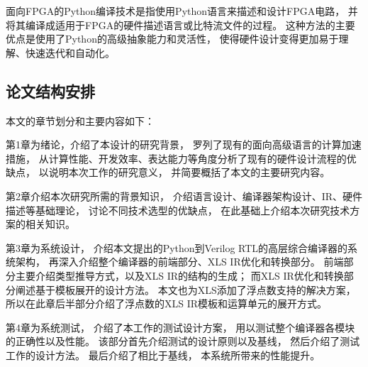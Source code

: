面向FPGA的Python编译技术是指使用Python语言来描述和设计FPGA电路，
并将其编译成适用于FPGA的硬件描述语言或比特流文件的过程。
这种方法的主要优点是使用了Python的高级抽象能力和灵活性，
使得硬件设计变得更加易于理解、快速迭代和自动化。

\subsection{论文结构安排}

本文的章节划分和主要内容如下：

第1章为绪论，介绍了本设计的研究背景，
罗列了现有的面向高级语言的计算加速措施，
从计算性能、开发效率、表达能力等角度分析了现有的硬件设计流程的优缺点，
以说明本次工作的研究意义，
并简要概括了本文的主要研究内容。

第2章介绍本次研究所需的背景知识，
介绍语言设计、编译器架构设计、IR、硬件描述等基础理论，
讨论不同技术选型的优缺点，
在此基础上介绍本次研究技术方案的相关知识。

第3章为系统设计，
介绍本文提出的Python到Verilog RTL的高层综合编译器的系统架构，
再深入介绍整个编译器的前端部分、XLS IR优化和转换部分。
前端部分主要介绍类型推导方式，以及XLS IR的结构的生成；
而XLS IR优化和转换部分阐述基于模板展开的设计方法。
本文也为XLS添加了浮点数支持的解决方案，
所以在此章后半部分介绍了浮点数的XLS IR模板和运算单元的展开方式。

第4章为系统测试，
介绍了本工作的测试设计方案，
用以测试整个编译器各模块的正确性以及性能。
该部分首先介绍测试的设计原则以及基线，
然后介绍了测试工作的设计方法。
最后介绍了相比于基线，
本系统所带来的性能提升。